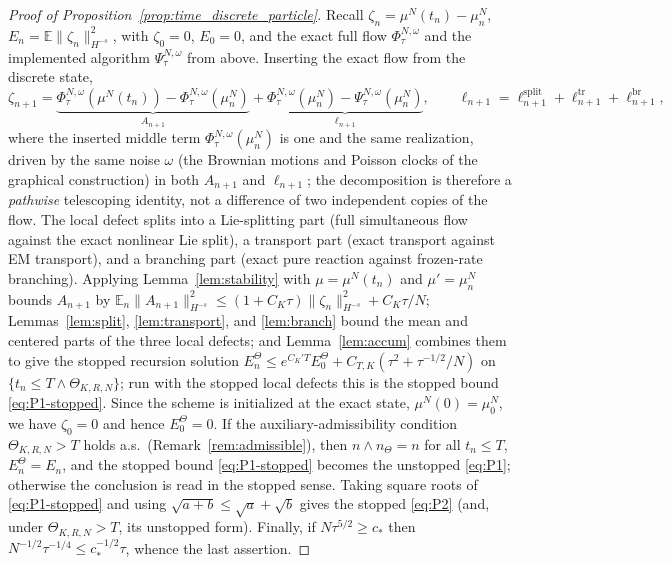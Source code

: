 \documentclass[a4paper,fleqn]{cas-sc}
\theoremstyle{definition}
\theoremstyle{remark}
\begin{document}
\begin{proof}[Proof of Proposition~\ref{prop:time_discrete_particle}]
Recall $\zeta_n=\mu^N(t_n)-\mu^N_n$, $E_n=\mathbb E\|\zeta_n\|_{H^{-s}}^2$, with
$\zeta_0=0$, $E_0=0$, and the exact full flow $\Phi^{N,\omega}_\tau$ and the
implemented algorithm $\Psi^{N,\omega}_\tau$ from above. Inserting the exact flow
from the discrete state,
\[
\zeta_{n+1}
=\underbrace{\Phi^{N,\omega}_\tau(\mu^N(t_n))-\Phi^{N,\omega}_\tau(\mu^N_n)}_{A_{n+1}}
+\underbrace{\Phi^{N,\omega}_\tau(\mu^N_n)-\Psi^{N,\omega}_\tau(\mu^N_n)}_{\ell_{n+1}},
\qquad
\ell_{n+1}=\ell^{\mathrm{split}}_{n+1}+\ell^{\mathrm{tr}}_{n+1}+\ell^{\mathrm{br}}_{n+1},
\]
where the inserted middle term $\Phi^{N,\omega}_\tau(\mu^N_n)$ is one and the same
realization, driven by the same noise $\omega$ (the Brownian motions and Poisson
clocks of the graphical construction) in both $A_{n+1}$ and $\ell_{n+1}$; the
decomposition is therefore a \emph{pathwise} telescoping identity, not a difference
of two independent copies of the flow. The local defect splits into a Lie-splitting
part (full simultaneous flow against the exact nonlinear Lie split), a transport
part (exact transport against EM transport), and a branching part (exact pure
reaction against frozen-rate branching). Applying Lemma~\ref{lem:stability} with $\mu=\mu^N(t_n)$ and
$\mu'=\mu^N_n$ bounds $A_{n+1}$ by
$\mathbb E_n\|A_{n+1}\|_{H^{-s}}^2\le(1+C_K\tau)\|\zeta_n\|_{H^{-s}}^2+C_K\tau/N$;
Lemmas~\ref{lem:split}, \ref{lem:transport}, and \ref{lem:branch} bound the mean
and centered parts of the three local defects; and Lemma~\ref{lem:accum} combines
them to give the stopped recursion solution
$E_n^\Theta\le e^{C_K'T}E_0^\Theta+C_{T,K}(\tau^2+\tau^{-1/2}/N)$ on
$\{t_n\le T\wedge\Theta_{K,R,N}\}$; run with the stopped
local defects this is the stopped bound \eqref{eq:P1-stopped}. Since the scheme is
initialized at the exact state, $\mu^N(0)=\mu^N_0$, we have $\zeta_0=0$ and hence
$E_0^\Theta=0$. If the auxiliary-admissibility condition $\Theta_{K,R,N}>T$ holds
a.s.\ (Remark~\ref{rem:admissible}),
then $n\wedge n_\Theta=n$ for all $t_n\le T$, $E_n^\Theta=E_n$, and the
stopped bound \eqref{eq:P1-stopped} becomes the unstopped \eqref{eq:P1}; otherwise
the conclusion is read in the stopped sense. Taking square roots of
\eqref{eq:P1-stopped} and using
$\sqrt{a+b}\le\sqrt a+\sqrt b$ gives the stopped \eqref{eq:P2} (and, under
$\Theta_{K,R,N}>T$, its unstopped form). Finally, if $N\tau^{5/2}\ge c_*$
then $N^{-1/2}\tau^{-1/4}\le c_*^{-1/2}\tau$, whence the last assertion.
\end{proof}
\end{document}

